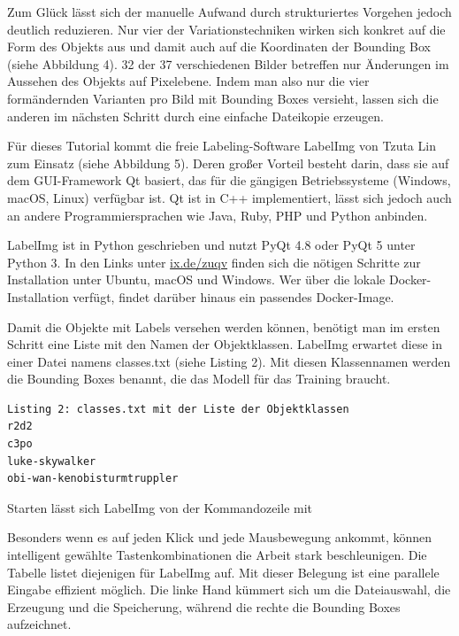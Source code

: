 Zum Glück lässt sich der manuelle Aufwand durch strukturiertes Vorgehen jedoch deutlich reduzieren. Nur vier der Varia­tionstechniken wirken sich konkret auf die Form des Objekts aus und damit auch auf die Koordinaten der Bounding Box (siehe Abbildung 4). 32 der 37 verschiedenen Bilder betreffen nur Änderungen im Aussehen des Objekts auf Pixelebene. Indem man also nur die vier formändernden Varianten pro Bild mit Bounding Boxes versieht, lassen sich die anderen im nächsten Schritt durch eine einfache Dateikopie erzeugen. 

Für dieses Tutorial kommt die freie Labeling-Software LabelImg von Tzuta Lin zum Einsatz (siehe Abbildung 5). Deren großer Vorteil besteht darin, dass sie auf dem GUI-Framework Qt basiert, das für die gängigen Betriebssysteme (Windows, macOS, Linux) verfügbar ist. Qt ist in C++ implementiert, lässt sich jedoch auch an andere Programmiersprachen wie Java, Ruby, PHP und Python anbinden. 

LabelImg ist in Python geschrieben und nutzt PyQt 4.8 oder PyQt 5 unter Python 3. In den Links unter \href{https://www.heise.de/select/ix/2020/6/softlinks/zuqv?wt_mc=pred.red.ix.ix062020.040.softlink.softlink}{ix.de/zuqv} finden sich die nötigen Schritte zur Installation unter Ubuntu, macOS und Windows. Wer über die lokale Docker-Installation verfügt, findet darüber hinaus ein passendes Docker-­Image. 

Damit die Objekte mit Labels versehen werden können, benötigt man im ersten Schritt eine Liste mit den Namen der Objektklassen. LabelImg erwartet diese in einer Datei namens classes.txt (siehe Listing 2). Mit diesen Klassennamen werden die Bounding Boxes benannt, die das Modell für das Training braucht. 

\begin{lstlisting}
Listing 2: classes.txt mit der Liste der Objektklassen 
r2d2
c3po
luke-skywalker
obi-wan-kenobisturmtruppler
\end{lstlisting}

Starten lässt sich LabelImg von der Kommandozeile mit 


Besonders wenn es auf jeden Klick und jede Mausbewegung ankommt, können intelligent gewählte Tastenkombinationen die Arbeit stark beschleunigen. Die Tabelle listet diejenigen für LabelImg auf. Mit dieser Belegung ist eine parallele Eingabe effizient möglich. Die linke Hand kümmert sich um die Dateiauswahl, die Erzeugung und die Speicherung, während die rechte die Bounding Boxes aufzeichnet. 

